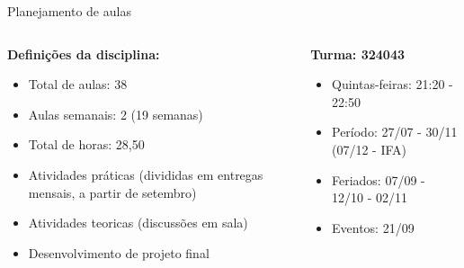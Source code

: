 \documentclass{beamer}
\begin{document}
\begin{frame}[fragile]{Planejamento de aulas}
      \begin{columns}
            \begin{column}{0.5\textwidth}
                  \textbf{Definições da disciplina:}
                  \begin{itemize}
                        \item Total de aulas: 38 
                        \item Aulas semanais: 2 (19 semanas)
                        \item Total de horas: 28,50
                        \item Atividades práticas (divididas em entregas mensais, a partir de setembro)
                        \item Atividades teoricas (discussões em sala)
                        \item Desenvolvimento de projeto final
      
                  \end{itemize}


            \end{column}
            \begin{column}{0.5\textwidth}
                 \textbf{Turma: 324043}
                  \begin{itemize}
                        \item Quintas-feiras: 21:20 - 22:50
                        \item Período: 27/07 - 30/11 (07/12 - IFA)
                        \item Feriados: 07/09 - 12/10 - 02/11
                        \item Eventos: 21/09
                  \end{itemize}
                  
            \end{column}
      \end{columns}
\end{frame}




%
%
%            
%        
\end{document}
